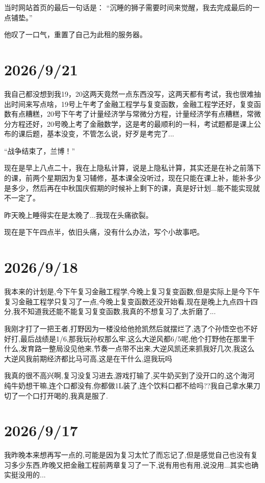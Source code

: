 当时网站首页的最后一句话是：
“沉睡的狮子需要时间来觉醒，我去完成最后的一点铺垫。”

他叹了一口气，重置了自己为此租的服务器。
\section*{2026/9/21}
我自己都没想到我19，20这两天竟然一点东西没写，这两天都有考试，我也很难抽出时间来写点啥，19号上午考了金融工程学与复变函数，金融工程学还好，复变函数有点糟糕，20号下午考了计量经济学与常微分方程，计量经济学有点糟糕，常微分方程还好，20号晚上考了金融数学，这是考的最顺利的一科，考试题都是课上公布的课后题，基本没变，不管怎么说，好歹是考完了...

“战争结束了，兰博！”

现在是早上八点二十，我在上隐私计算，说是上隐私计算，其实还是在补之前落下的课，前两个星期因为复习辅修，基本课全没听过，现在只能在课上补，能补多少是多少，然后再在中秋国庆假期的时候补上剩下的课，真是好计划...能不能实现就不一定了。

昨天晚上睡得实在是太晚了...我现在头痛欲裂。

现在是下午四点半，依旧头痛，没有什么办法，写个小故事吧。


\section*{2026/9/18}

我本来的计划是,今下午复习金融工程学,今晚上复习复变函数,但是实际上是今下午复习金融工程学只复习了一点,今晚上复变函数还没开始看,现在是晚上九点四十四分,我不知道我还能不能复习复变函数,我真的不想复习了,太折磨了...

我刚才打了一把王者,打野因为一楼没给他抢凯然后就摆烂了,选了个孙悟空也不好好打,最后战绩是1/6,那我玩孙权那么牢,这么大逆风都6/5呢,他个打野他在那里干什么,发育路一整局没见他来,节奏一点带不出来,大逆风凯还来抓我好几次,我这么大逆风我前期经济都比马可高,这是在干什么,逗我玩吗

我真的很不高兴啊,复习没复习进去,游戏打输了,买牛奶买到了没开口的,这个海河纯牛奶想干嘛,连个口都没有,你都做1L装了,连个饮料口都不给吗??我自己拿水果刀切了一个口打开喝的,我真是服了.

\section*{2026/9/17}

我昨晚本来想再写一点的,可能是因为复习太忙了而忘记了,但是感觉自己也没有复习多少东西,昨晚又把金融工程前两章复习了一下,说有用也有用,说没用...其实也确实挺没用的...

